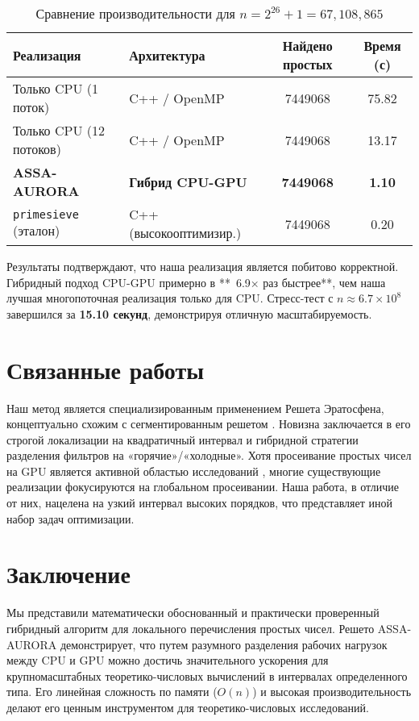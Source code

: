 \documentclass[11pt]{article}
\begin{document}
\begin{table}[h!]
\centering
\caption{Сравнение производительности для $n = 2^{26} + 1 = 67,108,865$}
\label{tab:results_small_n}
\begin{tabular}{l l S[table-format=8.0] S[table-format=2.4]}
\toprule
\textbf{Реализация} & \textbf{Архитектура} & {\textbf{Найдено простых}} & {\textbf{Время (с)}} \\
\midrule
Только CPU (1 поток) & C++ / OpenMP & 7449068 & 75.82 \\
Только CPU (12 потоков) & C++ / OpenMP & 7449068 & 13.17 \\
\textbf{ASSA-AURORA} & \textbf{Гибрид CPU-GPU} & \textbf{7449068} & \textbf{1.10} \\
\texttt{primesieve} (эталон) & C++ (высокооптимизир.) & 7449068 & 0.20 \\
\bottomrule
\end{tabular}
\end{table}

Результаты подтверждают, что наша реализация является побитово корректной. Гибридный подход CPU-GPU примерно в **~6.9× раз быстрее**, чем наша лучшая многопоточная реализация только для CPU. Стресс-тест с $n \approx 6.7 \times 10^8$ завершился за \textbf{15.10 секунд}, демонстрируя отличную масштабируемость.

\section{Связанные работы}
Наш метод является специализированным применением Решета Эратосфена, концептуально схожим с сегментированным решетом \cite{Crandall2005}. Новизна заключается в его строгой локализации на квадратичный интервал и гибридной стратегии разделения фильтров на «горячие»/«холодные». Хотя просеивание простых чисел на GPU является активной областью исследований \cite{cudasieve}, многие существующие реализации фокусируются на глобальном просеивании. Наша работа, в отличие от них, нацелена на узкий интервал высоких порядков, что представляет иной набор задач оптимизации.

\section{Заключение}
Мы представили математически обоснованный и практически проверенный гибридный алгоритм для локального перечисления простых чисел. Решето ASSA-AURORA демонстрирует, что путем разумного разделения рабочих нагрузок между CPU и GPU можно достичь значительного ускорения для крупномасштабных теоретико-числовых вычислений в интервалах определенного типа. Его линейная сложность по памяти ($O(n)$) и высокая производительность делают его ценным инструментом для теоретико-числовых исследований.
\end{document}
